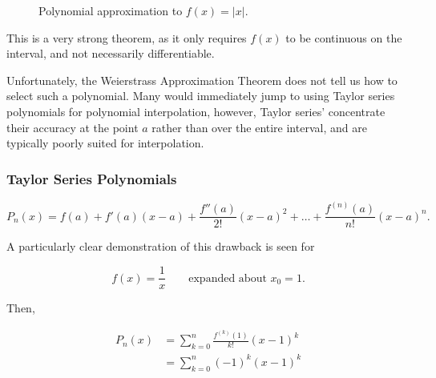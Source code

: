 \begin{figure}[h]
    \centering
    \caption{Polynomial approximation to $f(x) = |x|$.}
\end{figure}

This is a very strong theorem, as it only requires $f(x)$ to be continuous on 
the interval, and not necessarily differentiable.

Unfortunately, the Weierstrass Approximation Theorem does not tell us how to 
select such a polynomial. Many would immediately jump to using Taylor series
polynomials for polynomial interpolation, however, Taylor series' concentrate
their accuracy at the point $a$ rather than over the entire interval, and are
typically poorly suited for interpolation.

\subsubsection{Taylor Series Polynomials}

\[
P_n(x) = f(a) + f'(a)(x-a) + \frac{f''(a)}{2!}(x-a)^2 + \dots + \frac{f^{(n)}(a)}{n!}(x-a)^n
.\]

A particularly clear demonstration of this drawback is seen for

\[
f(x) = \frac{1}{x} \qquad \text{expanded about } x_0 = 1
.\]

Then,

\begin{align*}
  P_n(x) &= \sum_{k=0}^n \frac{f^{(k)}(1)}{k!}(x-1)^k\\
         &= \sum_{k=0}^n (-1)^k(x-1)^k \\
\end{align*}

